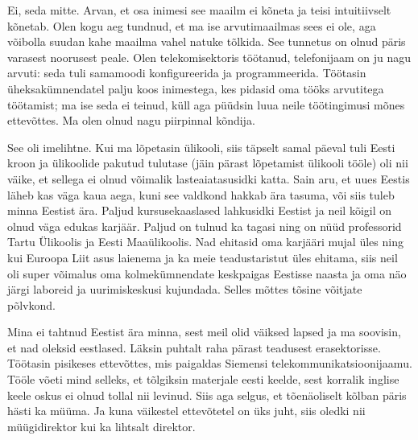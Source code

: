 
Ei, seda mitte. Arvan, et osa 
inimesi see maailm ei kõneta ja teisi intuitiivselt kõnetab. 
Olen kogu aeg tundnud, et ma ise arvutimaailmas sees ei ole, aga võibolla suudan kahe 
maailma vahel natuke tõlkida. See tunnetus on olnud päris varasest 
noorusest peale. Olen telekomisektoris töötanud, telefonijaam on ju nagu
arvuti: seda tuli samamoodi konfigureerida ja programmeerida. Töötasin üheksakümnendatel
palju koos inimestega, kes pidasid oma tööks arvutitega töötamist; ma ise seda ei teinud, küll aga püüdsin luua neile töötingimusi mõnes 
ettevõttes. Ma olen olnud nagu piirpinnal kõndija.


See oli imelihtne. Kui ma lõpetasin ülikooli, siis täpselt samal päeval tuli 
Eesti kroon ja ülikoolide pakutud tulutase 
(jäin pärast lõpetamist ülikooli tööle) oli nii väike, et sellega ei olnud 
võimalik lasteaiatasusidki katta. Sain aru, et 
uues Eestis läheb kas väga kaua aega, kuni see valdkond hakkab ära tasuma, või 
siis tuleb minna Eestist ära. Paljud kursusekaaslased lahkusidki Eestist 
ja neil kõigil on olnud väga edukas karjäär. Paljud on tulnud ka
tagasi ning on nüüd professorid Tartu Ülikoolis ja Eesti Maaülikoolis. Nad
ehitasid oma karjääri mujal üles ning kui Euroopa Liit asus 
laienema ja ka meie teadustaristut üles ehitama, siis neil oli super võimalus 
oma kolmekümnendate keskpaigas Eestisse naasta ja oma näo järgi 
laboreid ja uurimiskeskusi kujundada. Selles mõttes tõsine võitjate põlvkond.
 
Mina ei tahtnud Eestist ära minna, sest meil olid väiksed lapsed ja ma 
soovisin, et nad oleksid eestlased. Läksin puhtalt 
raha pärast teadusest erasektorisse. Töötasin pisikeses ettevõttes, mis paigaldas Siemensi 
telekommunikatsioonijaamu. Tööle võeti mind selleks, et tõlgiksin materjale eesti keelde, sest korralik inglise keele 
oskus ei olnud tollal nii levinud. Siis aga selgus, et tõenäoliselt kõlban 
päris hästi ka müüma. Ja kuna väikestel ettevõtetel on üks juht, siis 
oledki nii müügidirektor kui ka lihtsalt direktor. 



